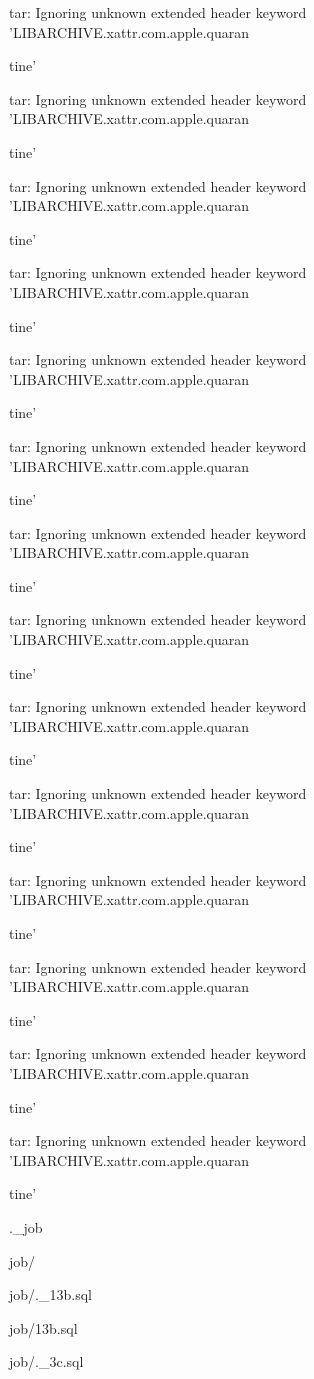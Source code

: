 \documentclass[11pt,a4paper]{article}
\begin{document}
tar: Ignoring unknown extended header keyword 'LIBARCHIVE.xattr.com.apple.quaran

tine'

tar: Ignoring unknown extended header keyword 'LIBARCHIVE.xattr.com.apple.quaran

tine'

tar: Ignoring unknown extended header keyword 'LIBARCHIVE.xattr.com.apple.quaran

tine'

tar: Ignoring unknown extended header keyword 'LIBARCHIVE.xattr.com.apple.quaran

tine'

tar: Ignoring unknown extended header keyword 'LIBARCHIVE.xattr.com.apple.quaran

tine'

tar: Ignoring unknown extended header keyword 'LIBARCHIVE.xattr.com.apple.quaran

tine'

tar: Ignoring unknown extended header keyword 'LIBARCHIVE.xattr.com.apple.quaran

tine'

tar: Ignoring unknown extended header keyword 'LIBARCHIVE.xattr.com.apple.quaran

tine'

tar: Ignoring unknown extended header keyword 'LIBARCHIVE.xattr.com.apple.quaran

tine'

tar: Ignoring unknown extended header keyword 'LIBARCHIVE.xattr.com.apple.quaran

tine'

tar: Ignoring unknown extended header keyword 'LIBARCHIVE.xattr.com.apple.quaran

tine'

tar: Ignoring unknown extended header keyword 'LIBARCHIVE.xattr.com.apple.quaran

tine'

tar: Ignoring unknown extended header keyword 'LIBARCHIVE.xattr.com.apple.quaran

tine'

tar: Ignoring unknown extended header keyword 'LIBARCHIVE.xattr.com.apple.quaran

tine'

.\_job

job/

job/.\_13b.sql

job/13b.sql

job/.\_3c.sql
\end{document}
